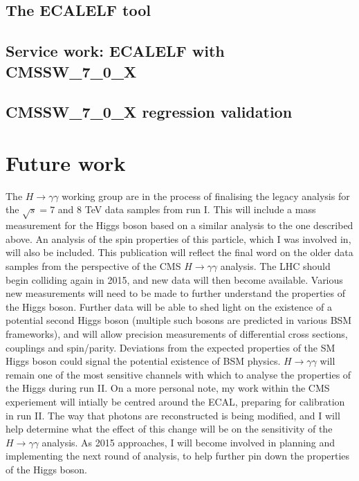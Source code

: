 \documentclass[10pt]{article}
\begin{document}
\subsection{The ECALELF tool}

\subsection{Service work: ECALELF with CMSSW\_7\_0\_X}

\subsection{CMSSW\_7\_0\_X regression validation}



\section{Future work}

The $H \rightarrow \gamma \gamma$ working group are in the process of finalising the legacy analysis for the $\sqrt{s}=7$ and $8$ TeV data samples from run I. This will include a mass measurement for the Higgs boson based on a similar analysis to the one described above. An analysis of the spin properties of this particle, which I was involved in, will also be included. This publication will reflect the final word on the older data samples from the perspective of the CMS $H \rightarrow \gamma \gamma$ analysis. The LHC should begin colliding again in 2015, and new data will then become available. Various new measurements will need to be made to further understand the properties of the Higgs boson. Further data will be able to shed light on the existence of a potential second Higgs boson (multiple such bosons are predicted in various BSM frameworks), and will allow precision measurements of differential cross sections, couplings and spin/parity. Deviations from the expected properties of the SM Higgs boson could signal the potential existence of BSM physics.  $H\rightarrow \gamma \gamma$ will remain one of the most sensitive channels with which to analyse the properties of the Higgs during run II.
On a more personal note, my work within the CMS experiement will intially be centred around the ECAL, preparing for calibration in run II. The way that photons are reconstructed is being modified, and I will help determine what the effect of this change will be on the sensitivity of the $H \rightarrow \gamma \gamma$ analysis. As 2015 approaches, I will become involved in planning and implementing the next round of analysis, to help further pin down the properties of the Higgs boson.
\end{document}
